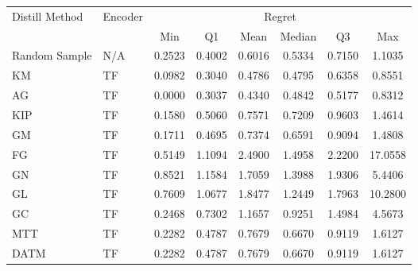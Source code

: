 \begin{tabular}{llcccccc}
\toprule
Distill Method & Encoder & \multicolumn{6}{c}{Regret} \\
 &  & Min & Q1 & Mean & Median & Q3 & Max \\
\midrule
Random Sample & N/A & 0.2523 & 0.4002 & 0.6016 & 0.5334 & 0.7150 & 1.1035 \\
\midrule
KM &  TF & 0.0982 & 0.3040 & 0.4786 & 0.4795 & 0.6358 & 0.8551 \\
\midrule
AG &  TF & 0.0000 & 0.3037 & 0.4340 & 0.4842 & 0.5177 & 0.8312 \\
\midrule
KIP &  TF & 0.1580 & 0.5060 & 0.7571 & 0.7209 & 0.9603 & 1.4614 \\
\midrule
GM &  TF & 0.1711 & 0.4695 & 0.7374 & 0.6591 & 0.9094 & 1.4808 \\
\midrule
FG &  TF & 0.5149 & 1.1094 & 2.4900 & 1.4958 & 2.2200 & 17.0558 \\
\midrule
GN &  TF & 0.8521 & 1.1584 & 1.7059 & 1.3988 & 1.9306 & 5.4406 \\
\midrule
GL &  TF & 0.7609 & 1.0677 & 1.8477 & 1.2449 & 1.7963 & 10.2800 \\
\midrule
GC &  TF & 0.2468 & 0.7302 & 1.1657 & 0.9251 & 1.4984 & 4.5673 \\
\midrule
MTT &  TF & 0.2282 & 0.4787 & 0.7679 & 0.6670 & 0.9119 & 1.6127 \\
DATM &  TF & 0.2282 & 0.4787 & 0.7679 & 0.6670 & 0.9119 & 1.6127 \\
\bottomrule
\end{tabular}
